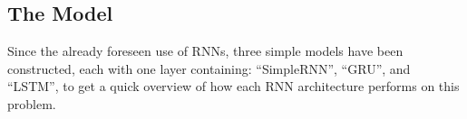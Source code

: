 \subsection{The Model}
Since the already foreseen use of RNNs, three simple models have been constructed, each with one layer containing:
\enquote{SimpleRNN}, \enquote{GRU}, and \enquote{LSTM}, to get a quick overview of how each RNN architecture performs on this problem.

